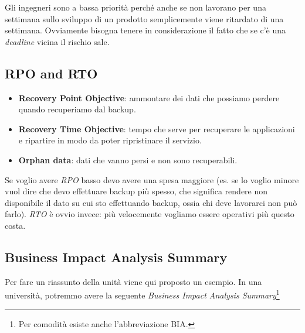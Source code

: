 
Gli ingegneri sono a bassa priorità perché anche se non lavorano per una 
settimana sullo sviluppo di un prodotto semplicemente viene ritardato di una 
settimana. Ovviamente bisogna tenere in considerazione il fatto che se c'è una 
\textit{deadline} vicina il rischio sale.

\subsection{RPO and RTO}

\begin{itemize}
 \item \textbf{Recovery Point Objective}: ammontare dei dati che possiamo 
perdere quando recuperiamo dal backup.

 \item \textbf{Recovery Time Objective}: tempo che serve per recuperare le 
applicazioni e ripartire in modo da poter ripristinare il servizio.

 \item \textbf{Orphan data}: dati che vanno persi e non sono recuperabili.
\end{itemize}

Se voglio avere \textit{RPO} basso devo avere una spesa maggiore (es. se lo 
voglio minore vuol dire che devo effettuare backup più spesso, che significa 
rendere non disponibile il dato su cui sto effettuando backup, ossia chi deve 
lavorarci non può farlo).
\textit{RTO} è ovvio invece: più velocemente vogliamo essere operativi più 
questo costa.

\subsection{Business Impact Analysis Summary}

Per fare un riassunto della unità viene qui proposto un esempio. In una 
università, potremmo avere la seguente \textit{Business Impact Analysis 
Summary}\footnote{Per comodità esiste anche l'abbreviazione BIA.}

\begin{table}[H]
\centering
{}
\caption{Un esempio di BIA per una Università}
\end{table}


